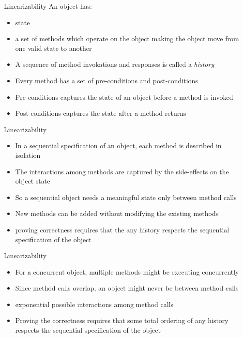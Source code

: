 \begin{frame}{Linearizability}
An object has:
\begin{itemize}
\item state
\item a set of methods which operate on the object making the object move from one valid state to another
\end{itemize}
\begin{itemize}
\item A sequence of method invokations and responses is called a \emph{history}
\item Every method has a set of pre-conditions and post-conditions
\item Pre-conditions captures the state of an object before a method is invoked
\item Post-conditions captures the state after a method returns
\end{itemize}
\end{frame}

\begin{frame}{Linearizability}
\begin{itemize}
\item In a sequential specification of an object, each method is described in isolation
\item The interactions among methods are captured by the side-effects on the object state
\item So a sequential object needs a meaningful state only between method calls
\item New methods can be added without modifying the existing methods
\item proving correctness requires that the any history respects the sequential specification of the object
\end{itemize}
\end{frame}

\begin{frame}{Linearizability}
\begin{itemize}
\item For a concurrent object, multiple methods might be executing concurrently
\item Since method calls overlap, an object might never be between method calls
\item exponential possible interactions among method calls
\item Proving the correctness requires that some total ordering of any history respects the sequential specification of the object
\end{itemize}
\end{frame}

